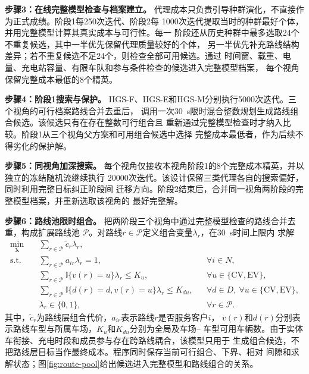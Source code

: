 \textbf{步骤3：在线完整模型检查与档案建立。}
代理成本只负责引导种群演化，不直接作为正式成绩。阶段1每250次迭代、阶段2每
1000次迭代提取当时的种群最好个体，并用完整模型计算其真实成本与可行性。每一
阶段还从历史种群中最多选取24个不重复候选，其中一半优先保留代理质量较好的个体，
另一半优先补充路线结构差异；若不重复候选不足24个，则检查全部可用候选。通过
时间窗、载重、电量、充电站容量、有限车队和参与条件检查的候选进入完整模型档案，
每个视角保留完整成本最低的8个精英。

\textbf{步骤4：阶段1搜索与保护。}
HGS-F、HGS-E和HGS-M分别执行5000次迭代。三个视角的可行档案路线合并去重后，
调用一次30~s限时混合整数规划生成路线组合候选。该候选只有在存在整数可行组合且
重新通过完整模型检查时才纳入比较。阶段1从三个视角父方案和可用组合候选中选择
完整成本最低者，作为后续不得劣化的保护解。

\textbf{步骤5：同视角加深搜索。}
每个视角仅接收本视角阶段1的8个完整成本精英，并以独立的冻结随机流继续执行
20000次迭代。该设计保留三类代理各自的搜索偏好，同时利用完整目标纠正阶段间
迁移方向。阶段2结束后，合并同一视角两阶段的完整模型档案，并重新选取该视角的
最好完整解。

\textbf{步骤6：路线池限时组合。}
把两阶段三个视角中通过完整模型检查的路线合并去重，构成扩展路线池
$\mathcal P$。对路线$r\in\mathcal P$定义组合变量$\lambda_r$，在30~s时间上限内
求解
\begin{equation}
\begin{aligned}
\min_{\boldsymbol{\lambda}}\quad
  & \sum_{r\in\mathcal P}\widetilde c_r\lambda_r,\\
\mathrm{s.t.}\quad
  & \sum_{r\in\mathcal P}a_{ir}\lambda_r=1,
    && \forall i\in N,\\
  & \sum_{r\in\mathcal P}\mathbb I\{v(r)=u\}\lambda_r\le K_u,
    && \forall u\in\{\mathrm{CV},\mathrm{EV}\},\\
  & \sum_{r\in\mathcal P}\mathbb I\{d(r)=d,v(r)=u\}\lambda_r\le K_{du},
    && \forall d\in D,\ \forall u\in\{\mathrm{CV},\mathrm{EV}\},\\
  & \lambda_r\in\{0,1\},
    && \forall r\in\mathcal P .
\end{aligned}
\label{eq:sp-recombination}
\end{equation}
其中，$\widetilde c_r$为路线层组合代价，$a_{ir}$表示路线$r$是否服务客户$i$，
$v(r)$和$d(r)$分别表示路线车型与所属车场，$K_u$和$K_{du}$分别为全局及车场--
车型可用车辆数。由于实体车衔接、充电时段和成员参与存在跨路线耦合，该模型只用于
生成组合候选，不把路线层目标当作最终成本。程序同时保存当前可行组合、下界、相对
间隙和求解状态；图\ref{fig:route-pool}给出候选进入完整模型和路线组合的关系。

